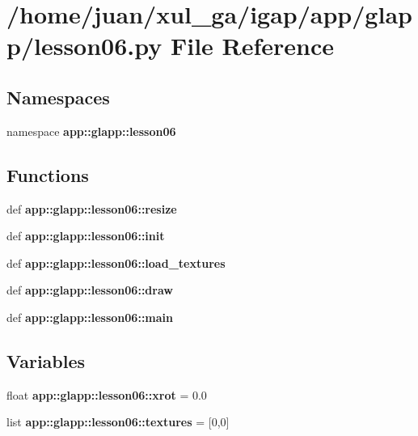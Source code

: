 \section{/home/juan/xul\_\-ga/igap/app/glapp/lesson06.py File Reference}
\label{lesson06_8py}
\subsection*{Namespaces}
\begin{CompactItemize}
\item 
namespace {\bf app::glapp::lesson06}
\end{CompactItemize}
\subsection*{Functions}
\begin{CompactItemize}
\item 
def {\bf app::glapp::lesson06::resize}
\item 
def {\bf app::glapp::lesson06::init}
\item 
def {\bf app::glapp::lesson06::load\_\-textures}
\item 
def {\bf app::glapp::lesson06::draw}
\item 
def {\bf app::glapp::lesson06::main}
\end{CompactItemize}
\subsection*{Variables}
\begin{CompactItemize}
\item 
float {\bf app::glapp::lesson06::xrot} = 0.0
\item 
list {\bf app::glapp::lesson06::textures} = [0,0]
\end{CompactItemize}
